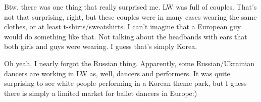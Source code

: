 \begin{post}
\begin{content}
Btw. there was one thing that really surprised me. LW was full of couples. That's not that surprising, right, but these couples were in many cases wearing the same clothes, or at least t-shirts/sweatshirts. I can't imagine that a European guy would do something like that. Not talking about the headbands with ears that both girls and guys were wearing. I guess that's simply Korea.



Oh yeah, I nearly forgot the Russian thing. Apparently, some Russian/Ukrainian dancers are working in LW as, well, dancers and performers. It was quite surprising to see white people performing in a Korean theme park, but I guess there is simply a limited market for ballet dancers in Europe:)
	\end{content}
\end{post}
